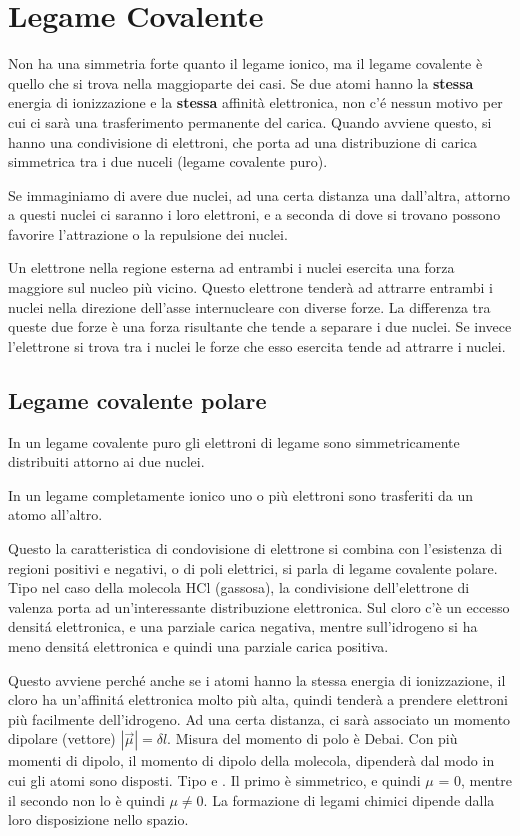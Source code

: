 \documentclass[a4paper]{article}
\begin{document}
\section{Legame Covalente}
Non ha una simmetria forte quanto il legame ionico, ma il legame covalente è quello che si trova nella maggioparte dei casi. Se due atomi hanno la \textbf{stessa} energia di ionizzazione e la \textbf{stessa} affinità elettronica, non c'é nessun motivo per cui ci sarà una trasferimento permanente del carica. Quando avviene questo, si hanno una condivisione di elettroni, che porta ad una distribuzione di carica simmetrica tra i due nuceli (legame covalente puro). 

Se immaginiamo di avere due nuclei, ad una certa distanza una dall'altra, attorno a questi nuclei ci saranno i loro elettroni, e a seconda di dove si trovano possono favorire l'attrazione o la repulsione dei nuclei. 

Un elettrone nella regione esterna ad entrambi i nuclei esercita una forza maggiore sul nucleo più vicino. Questo elettrone tenderà ad attrarre entrambi i nuclei nella direzione dell'asse internucleare con diverse forze. La differenza tra queste due forze è una forza risultante che tende a separare i due nuclei. Se invece l'elettrone si trova tra i nuclei le forze che esso esercita tende ad attrarre i nuclei. 

\subsection{Legame covalente polare}
In un legame covalente puro gli elettroni di legame sono simmetricamente distribuiti attorno ai due nuclei. 

In un legame completamente ionico uno o più elettroni sono trasferiti da un atomo all'altro.

Questo la caratteristica di condovisione di elettrone si combina con l'esistenza di regioni positivi e negativi, o di poli elettrici, si parla di legame covalente polare. Tipo nel caso della molecola HCl (gassosa), la condivisione dell'elettrone di valenza porta ad un'interessante distribuzione elettronica. Sul cloro c'è un eccesso densitá elettronica, e una parziale carica negativa, mentre sull'idrogeno si ha meno densitá elettronica e quindi una parziale carica positiva. 

Questo avviene perché anche se i atomi hanno la stessa energia di ionizzazione, il cloro ha un'affinitá elettronica molto più alta, quindi tenderà a prendere elettroni più facilmente dell'idrogeno. Ad una certa distanza, ci sarà associato un momento dipolare (vettore) $ |\vec{\mu}| = \delta l$. Misura del momento di polo è Debai. Con più momenti di dipolo, il momento di dipolo della molecola, dipenderà dal modo in cui gli atomi sono disposti. Tipo  e . Il primo è simmetrico, e quindi $\mu$ = 0, mentre il secondo non lo è quindi $\mu \neq 0$. La formazione di legami chimici dipende dalla loro disposizione nello spazio. 
\end{document}
